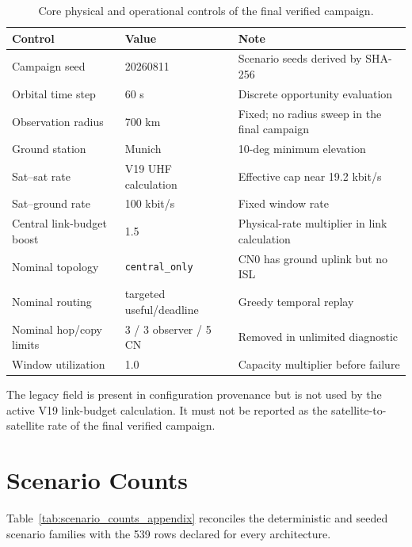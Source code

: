 \begin{table}[htbp]
\centering
\caption{Core physical and operational controls of the final verified campaign.}
\label{tab:final_controls_appendix}
\begin{tabularx}{\textwidth}{L{0.38\textwidth}L{0.25\textwidth}Y}
\toprule
Control & Value & Note \\
\midrule
Campaign seed & 20260811 & Scenario seeds derived by SHA-256 \\
Orbital time step & 60 s & Discrete opportunity evaluation \\
Observation radius & 700 km & Fixed; no radius sweep in the final campaign \\
Ground station & Munich & 10-deg minimum elevation \\
Sat--sat rate & V19 UHF calculation & Effective cap near 19.2 kbit/s \\
Sat--ground rate & 100 kbit/s & Fixed window rate \\
Central link-budget boost & 1.5 & Physical-rate multiplier in link calculation \\
Nominal topology & \texttt{central\_only} & CN0 has ground uplink but no ISL \\
Nominal routing & targeted useful/deadline & Greedy temporal replay \\
Nominal hop/copy limits & 3 / 3 observer / 5 CN & Removed in unlimited diagnostic \\
Window utilization & 1.0 & Capacity multiplier before failure \\
\bottomrule
\end{tabularx}
\end{table}

The legacy field  is present in configuration provenance but is not used by the active V19 link-budget calculation. It must not be reported as the satellite-to-satellite rate of the final verified campaign.

\section{Scenario Counts}

Table~\ref{tab:scenario_counts_appendix} reconciles the deterministic and seeded scenario families with the 539 rows declared for every architecture.

